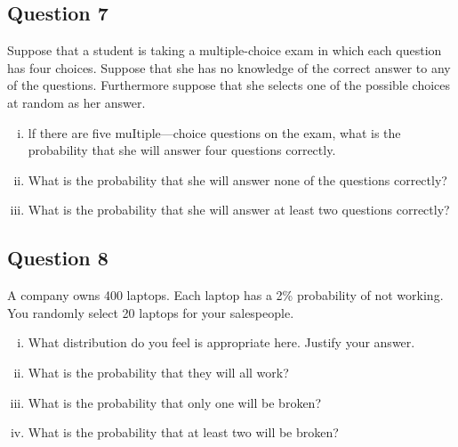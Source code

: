 \documentclass[]{report}
\begin{document}
\subsection*{Question 7}
Suppose that a student is taking a multiple-choice exam in which each question has four choices.
Suppose that she has no knowledge of the correct answer to any of the questions. Furthermore suppose that she selects one of the possible choices at random as her answer.
\begin{enumerate}[(i)]
\item lf there are five muItiple—choice questions on the exam, what is the probability that she will answer four questions correctly.
\item What is the probability that she will answer none of the questions correctly?
\item What is the probability that she will answer at least two questions correctly?
\end{enumerate}




\subsection*{Question 8}
A company owns 400 laptops. Each laptop has a 2\% probability of not working. You randomly select 20 laptops for your salespeople.
\begin{enumerate}[(i)]
\item What distribution do you feel is appropriate here. Justify your answer. 
\item What is the probability that they will all work?
\item What is the probability that only one will be broken?
\item What is the probability that at least two will be broken? 
\end{enumerate}
\end{document}
